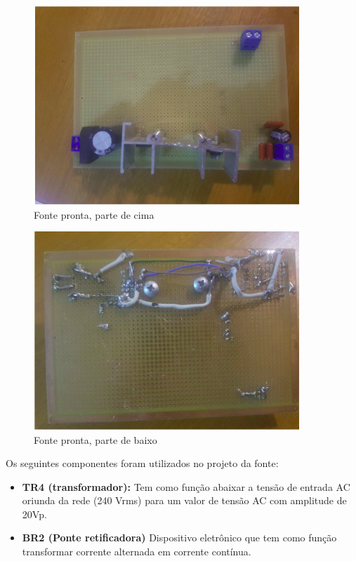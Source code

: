 \begin{figure}[H]
	\centering
	\includegraphics[width=10cm]{figuras/fonte_frente.png}
	\caption{Fonte pronta, parte de cima}
	\label{Fonte pronta parte de cima}
\end{figure}

\begin{figure}[H]
	\centering
	\includegraphics[width=10cm]{figuras/fonte_tras.png}
	\caption{Fonte pronta, parte de baixo}
	\label{Fonte pronta parte de trás}
\end{figure}


Os seguintes componentes foram utilizados  no projeto da fonte:

\begin{itemize}
	
	\item \textbf{TR4 (transformador):}   Tem como função abaixar a tensão de entrada AC oriunda da rede (240 Vrms) para um valor de tensão AC com amplitude de 20Vp.  
	
	\item \textbf{BR2 (Ponte retificadora)} Dispositivo eletrônico que tem como função transformar corrente alternada em corrente contínua.
	
\end{itemize}


